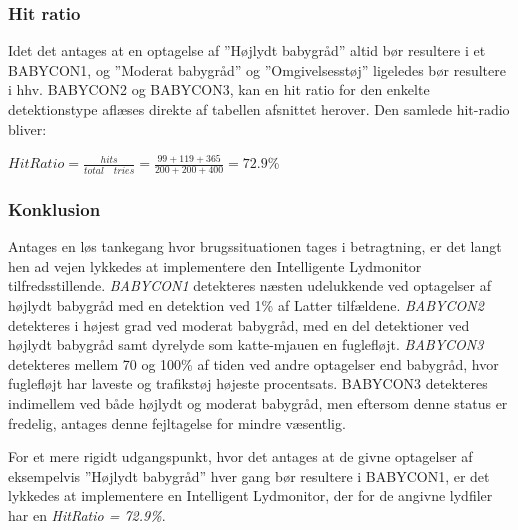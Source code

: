 \subsubsection{Hit ratio}
Idet det antages at en optagelse af ''Højlydt babygråd'' altid bør resultere i et BABYCON1, og ''Moderat babygråd'' og ''Omgivelsesstøj'' ligeledes bør resultere i hhv. BABYCON2 og BABYCON3, kan en hit ratio for den enkelte detektionstype aflæses direkte af tabellen afsnittet herover. Den samlede hit-radio bliver:

\begin{center}
$ HitRatio=\frac { hits }{ total\quad tries } =\frac { 99+119+365 }{ 200+200+400 } =72.9 $\%
\end{center}


\subsubsection{Konklusion}
Antages en løs tankegang hvor brugssituationen tages i betragtning, er det langt hen ad vejen lykkedes at implementere den Intelligente Lydmonitor tilfredsstillende. \textit{BABYCON1} detekteres næsten udelukkende ved optagelser af højlydt babygråd med en detektion ved 1\% af Latter tilfældene. \textit{BABYCON2} detekteres i højest grad ved moderat babygråd, med en del detektioner ved højlydt babygråd samt dyrelyde som katte-mjauen en fuglefløjt. \textit{BABYCON3} detekteres mellem 70 og 100\% af tiden ved andre optagelser end babygråd, hvor fuglefløjt har laveste og trafikstøj højeste procentsats. BABYCON3 detekteres indimellem ved både højlydt og moderat babygråd, men eftersom denne status er fredelig, antages denne fejltagelse for mindre væsentlig.

For et mere rigidt udgangspunkt, hvor det antages at de givne optagelser af eksempelvis ''Højlydt babygråd'' hver gang bør resultere i BABYCON1,  er det lykkedes at implementere en Intelligent Lydmonitor, der for de angivne lydfiler har en \textit{HitRatio = 72.9\%}.

